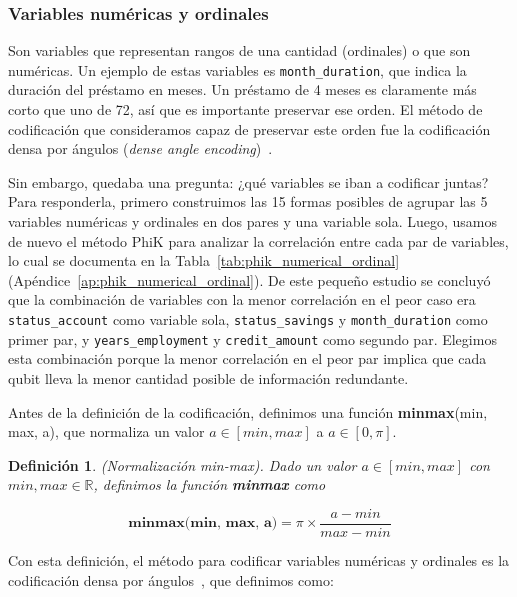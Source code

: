 \documentclass{ieeeaccess}
\newtheorem{definition}{Definición}[section]
\begin{document}
\subsubsection{Variables numéricas y ordinales}

Son variables que representan rangos de una cantidad (ordinales) o que son numéricas. Un ejemplo de estas variables es \texttt{month\_duration}, que indica la duración del préstamo en meses. Un préstamo de 4 meses es claramente más corto que uno de 72, así que es importante preservar ese orden. El método de codificación que consideramos capaz de preservar este orden fue la codificación densa por ángulos (\textit{dense angle encoding})~\cite{ibm_encoding}.

Sin embargo, quedaba una pregunta: ¿qué variables se iban a codificar juntas? Para responderla, primero construimos las 15 formas posibles de agrupar las 5 variables numéricas y ordinales en dos pares y una variable sola. Luego, usamos de nuevo el método PhiK para analizar la correlación entre cada par de variables, lo cual se documenta en la Tabla~\ref{tab:phik_numerical_ordinal} (Apéndice~\ref{ap:phik_numerical_ordinal}). De este pequeño estudio se concluyó que la combinación de variables con la menor correlación en el peor caso era \texttt{status\_account} como variable sola, \texttt{status\_savings} y \texttt{month\_duration} como primer par, y \texttt{years\_employment} y \texttt{credit\_amount} como segundo par. Elegimos esta combinación porque la menor correlación en el peor par implica que cada qubit lleva la menor cantidad posible de información redundante.

Antes de la definición de la codificación, definimos una función \textbf{minmax}(min, max, a), que normaliza un valor $a \in [min , max]$ a $a \in [0 , \pi ]$.

\begin{definition}
  (Normalización min-max). Dado un valor $a \in [min , max]$ con $min, max \in \mathbb{R}$, definimos la función \textbf{minmax} como

  \[
    \textbf{minmax(min, max, a)} = \pi \times \frac{a-min}{max-min}
  \]
  \label{def:minmax}
\end{definition}

Con esta definición, el método para codificar variables numéricas y ordinales es la codificación densa por ángulos~\cite{ibm_encoding}, que definimos como:
\end{document}
